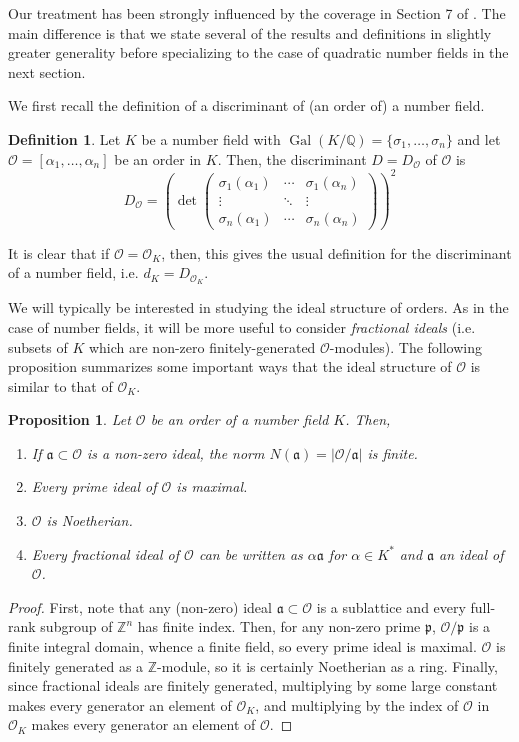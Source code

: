 \documentclass{amsart}
\newtheorem{prop}[thm]{Proposition}
\theoremstyle{definition}
\newtheorem{definition}[thm]{Definition}
\theoremstyle{remark}
\numberwithin{equation}{section}
\newcommand{\cO}{\mathcal O}
\newcommand{\fka}{\mathfrak a}
\newcommand{\fkp}{\mathfrak p}
\newcommand{\bbQ}{\mathbb Q}
\newcommand{\bbZ}{\mathbb Z}
\DeclareMathOperator{\Gal}{Gal}
\begin{document}
Our treatment has been strongly influenced by the coverage in Section 7 of \cite{CoxPrimes}. The main difference is that we state several of the results and definitions in slightly greater generality before specializing to the case of quadratic number fields in the next section.

We first recall the definition of a discriminant of (an order of) a number field.

\begin{definition}
Let $K$ be a number field with $\Gal(K/\bbQ) = \{\sigma_{1}, \dots, \sigma_{n}\}$ and let $\cO = [\alpha_{1}, \dots, \alpha_{n}]$ be an order in $K$. Then, the discriminant $D = D_{\cO}$ of $\cO$ is
\[
D_{\cO} = \left( \det \left( \begin{array}{ccc} \sigma_{1}(\alpha_{1}) & \cdots & \sigma_{1}(\alpha_{n}) \\ \vdots & \ddots & \vdots \\ \sigma_{n}(\alpha_{1}) & \cdots & \sigma_{n}(\alpha_{n}) \end{array}\right)\right)^2
\]
\end{definition}

It is clear that if $\cO =  \cO_{K}$, then, this gives the usual definition for the discriminant of a number field, i.e. $d_{K} = D_{\cO_{K}}$. 

We will typically be interested in studying the ideal structure of orders. As in the case of number fields, it will be more useful to consider \emph{fractional ideals} (i.e. subsets of $K$ which are non-zero finitely-generated $\cO$-modules). The following proposition summarizes some important ways that the ideal structure of $\cO$ is similar to that of $\cO_{K}$. 

\begin{prop}
Let $\cO$ be an order of a number field $K$. Then,
\begin{enumerate}
\item If $\fka \subset \cO$ is a non-zero ideal, the \emph{norm} $N(\fka) = |\cO/\fka|$ is finite.
\item Every prime ideal of $\cO$ is maximal.
\item $\cO$ is Noetherian.
\item Every fractional ideal of $\cO$ can be written as $\alpha \fka$ for $\alpha \in K^*$ and $\fka$ an ideal of $\cO$.
\end{enumerate}
\end{prop}

\begin{proof}
First, note that any (non-zero) ideal $\fka \subset \cO$ is a sublattice and every full-rank subgroup of $\bbZ^n$ has finite index. Then, for any non-zero prime $\fkp$, $\cO/\fkp$ is a finite integral domain, whence a finite field, so every prime ideal is maximal. $\cO$ is finitely generated as a $\bbZ$-module, so it is certainly Noetherian as a ring. Finally, since fractional ideals are finitely generated, multiplying by some large constant makes every generator an element of $\cO_K$, and multiplying by the index of $\cO$ in $\cO_{K}$ makes every generator an element of $\cO$.
\end{proof}
\end{document}
